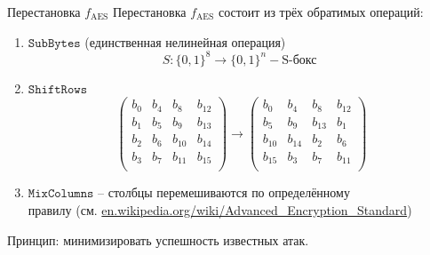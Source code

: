 \documentclass[usenames,dvipsnames,8pt,aspectratio=169]{beamer}
\begin{document}
\begin{frame}{Перестановка $f_{\text{AES}}$}
\Large
Перестановка $f_{\text{AES}}$ состоит из трёх обратимых операций: \\[5pt]
\begin{enumerate}
	\itemsep10pt
	\item $\mathtt{SubBytes}$ (единственная нелинейная операция)
	\[
	S: \{0,1\}^8 \rightarrow \{0,1\}^n - \text{S-бокс }
	\]
	\item  $\mathtt{ShiftRows}$
	\[
	\begin{pmatrix}
	b_0 & b_4 & b_8 & b_{12} \\
	b_1 & b_5 & b_9 & b_{13} \\
	b_2 & b_6 & b_{10} & b_{14} \\
	b_3 & b_7 & b_{11} & b_{15}  \\
	\end{pmatrix}
	\rightarrow
	\begin{pmatrix}
	b_0 & b_4 & b_8 & b_{12} \\
	b_5 & b_9 & b_{13} & b_1 \\
	b_{10} & b_{14} & b_{2} & b_{6} \\
	b_{15} & b_{3} & b_{7} & b_{11}  \\
	\end{pmatrix}
	\]
	
	\item  $\mathtt{MixColumns}$ -- столбцы перемешиваются по определённому \\ правилу (см. \url{en.wikipedia.org/wiki/Advanced_Encryption_Standard})

	
\end{enumerate}

\vspace{20pt}

Принцип: минимизировать успешность известных атак.	

\end{frame}
\end{document}
